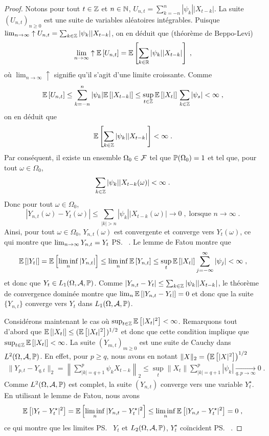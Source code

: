 \begin{proof}\smartqed
Notons pour tout $t \in \mathbb{Z}$ et $n \in \mathbb{N}$, $U_{n,t} = \sum_{k=-n}^{n} |\psi_k| |X_{t-k}|$. La suite
$(U_{n,t})_{n \geq 0}$ est une suite de variables al\'eatoires int\'egrables. Puisque $\lim_{n \rightarrow \infty} \uparrow U_{n,t} = \sum_{k\in\mathbb{Z}}|\psi_k| |X_{t-k}|$, on en d\'eduit que (th\'eor\`eme de Beppo-Levi)
$$
\lim_{n \to \infty} \uparrow {\mathbb E}\left[ U_{n,t} \right] = {\mathbb E}\left[ \sum_{k\in\mathbb{R}}|\psi_k| |X_{t-k}| \right]\;,
$$
o\`u $\lim_{n \to \infty} \uparrow$ signifie qu'il s'agit d'une limite croissante.
Comme
$$
{\mathbb E}\left[ U_{n,t} \right]\leq \sum_{k=-n}^{n} |\psi_k| {\mathbb E}\left[ |X_{t-k}| \right] \leq \sup_{t \in \mathbb{Z}} {\mathbb E}\left[ |X_t| \right] \, \sum_{k\in\mathbb{Z}} |\psi_s|
<\infty\;,
$$
on en d\'eduit que
\[
{\mathbb E}\left[ \sum_{k\in\mathbb{Z}} |\psi_k| |X_{t-k}|  \right]< \infty \;.
\]
Par cons\'equent, il existe un ensemble $\Omega_0 \in \mathcal{F}$ tel que $\mathbb{P}(\Omega_0) = 1$
et tel que, pour tout $\omega \in \Omega_0$,
\[
\sum_{k\in\mathbb{Z}} |\psi_k| | X_{t-k}(\omega) | < \infty\; .
\]
Donc pour tout $\omega \in \Omega_0$,
$$
|Y_{n,t}(\omega)-Y_t(\omega)|\leq\sum_{|k|>n}|\psi_k||X_{t-k}(\omega)|\to 0\;,\;
\textrm{lorsque } n\to\infty\;.
$$
Ainsi, pour tout $\omega \in \Omega_0$, $Y_{n,t}(\omega)$ est convergente et converge vers
$Y_t(\omega)$, ce qui montre que $\lim_{n \rightarrow \infty} Y_{n,t}= Y_t$ \ps\ . Le lemme de Fatou montre que
\[
{\mathbb E}\left[ |Y_t| \right]= {\mathbb E}\left[ \liminf_n |Y_{n,t}| \right] \leq \liminf_n {\mathbb E}\left[ Y_{n,t} \right] \leq \sup_t {\mathbb E}\left[ |X_t| \right] \sum_{j=-\infty}^\infty |\psi_j| < \infty \;,
\]
et donc que $Y_t \in L_1(\Omega,\mathcal{A},\mathbb{P})$. Comme $|Y_{n,t} - Y_t| \leq \sum_{k \in \mathbb{Z}} |\psi_k| |X_{t-k}|$,
le th\'eor\`eme de convergence domin\'ee montre que $\lim_n {\mathbb E}\left[ |Y_{n,t}-Y_t| \right] = 0$ et donc que la suite
$\{ Y_{n,t} \}$ converge vers $Y_t$ dans $L_1(\Omega,\mathcal{A},\mathbb{P})$.

Consid\'erons maintenant le cas o\`u $\sup_{t \in \mathbb{Z}}
{\mathbb E}\left[ |X_{t}|^2 \right] < \infty$. Remarquons tout d'abord que ${\mathbb E}\left[ 
|X_{t}| \right] \leq ({\mathbb E}\left[ |X_{t}|^2 \right])^{1/2}$ et donc que cette condition
implique que $\sup_{t \in \mathbb{Z}} {\mathbb E}\left[ |X_{t}| \right] < \infty$. La
suite $(Y_{m,t})_{m\geq 0}$ est une suite de Cauchy dans
$L^2(\Omega,\mathcal{A},\mathbb{P})$. En effet, pour $p \geq q$,
nous avons en notant $\| X \|_2 = \left( {\mathbb E}\left[ |X|^2 \right] \right)^{1/2}$
\begin{multline*}
\|Y_{p,t} - Y_{q,t} \|_2 = \left\| \sum_{|k|=q+1}^p \psi_k X_{t-k} \right\|_2
\leq \sup_t \|X_t\| \sum_{|k|=q+1}^p |\psi_k|  \underset{q,p \rightarrow \infty}{\longrightarrow} 0\;.
\end{multline*}
Comme $L^2(\Omega,\mathcal{A},\mathbb{P})$ est complet, la suite $(Y_{n,t})$ converge vers une variable $Y_t^\star$.
En utilisant le lemme de Fatou, nous avons
\[
{\mathbb E}\left[ |Y_t - Y_t^\star|^2 \right] = {\mathbb E}\left[ \liminf_n |Y_{n,t} - Y_t^{\star}|^2 \right] \leq \liminf_n {\mathbb E}\left[ |Y_{n,t}- Y_t^{\star}|^2 \right]= 0 \;,
\]
ce qui montre que les limites \ps\ $Y_t$ et $L_2(\Omega,\mathcal{A},\mathbb{P})$, $Y_t^\star$ co\"{i}ncident \ps\ .

\end{proof}


